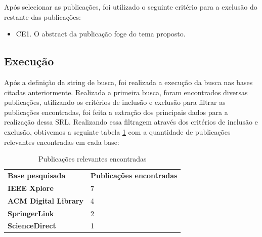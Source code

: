 \documentclass[12pt]{article}
\begin{document}
Após selecionar as publicações, foi utilizado o seguinte critério para a exclusão do restante das publicações:

\begin{itemize}
  \item CE1. O abstract da publicação foge do tema proposto.
\end{itemize}

\subsection{Execução}

Após a definição da string de busca, foi realizada a execução da busca nas bases citadas anteriormente. Realizada a primeira
busca, foram encontrados diversas publicações, utilizando os critérios de inclusão e exclusão para filtrar as publicações
encontradas, foi feita a extração dos principais dados para a realização dessa SRL. Realizando essa filtragem através dos
critérios de inclusão e exclusão, obtivemos a seguinte tabela \ref{publicações} com a quantidade de publicações relevantes
encontradas em cada base:


\begin{table}[h]
 \centering
 {\renewcommand\arraystretch{1.25}
 \begin{tabular}{ l l }
  \cline{1-1}\cline{2-2}
    \multicolumn{1}{|p{4.500cm}|}{\textbf{Base pesquisada}} &
    \multicolumn{1}{p{4.500cm}|}{\textbf{Publicações encontradas}}
  \\
  \cline{1-1}\cline{2-2}
    \multicolumn{1}{|p{4.500cm}|}{\textbf{IEEE Xplore} \centering } &
    \multicolumn{1}{p{4.500cm}|}{7 \centering }
  \\
  \cline{1-1}\cline{2-2}
    \multicolumn{1}{|p{4.500cm}|}{\textbf{ACM Digital Library} \centering } &
    \multicolumn{1}{p{4.500cm}|}{4 \centering }
  \\
  \cline{1-1}\cline{2-2}
    \multicolumn{1}{|p{4.500cm}|}{\textbf{SpringerLink} \centering } &
    \multicolumn{1}{p{4.500cm}|}{2 \centering }
  \\
  \cline{1-1}\cline{2-2}
    \multicolumn{1}{|p{4.500cm}|}{\textbf{ScienceDirect} \centering } &
    \multicolumn{1}{p{4.500cm}|}{1 \centering }
  \\
  \hline

 \end{tabular} }
 \caption{Publicações relevantes encontradas}
 \label{publicações}
\end{table}
\end{document}
